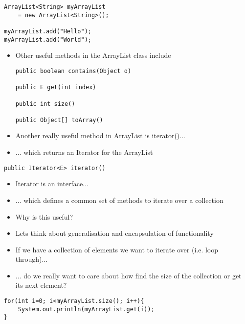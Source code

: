 \documentclass{beamer}
\begin{document}
\begin{frame}[fragile]
\begin{block}{}
\begin{lstlisting}
ArrayList<String> myArrayList 
    = new ArrayList<String>();

myArrayList.add("Hello");
myArrayList.add("World");
\end{lstlisting}
\end{block}
\end{frame} 

\begin{frame}[fragile]
\begin{itemize}
\item Other useful methods in the ArrayList class include
\begin{block}{}
\begin{lstlisting}
public boolean contains(Object o)

public E get(int index)

public int size()

public Object[] toArray()
\end{lstlisting}
\end{block}
\end{itemize}
\end{frame} 

\begin{frame}[fragile]
\begin{itemize}
\item Another really useful method in ArrayList is iterator()...
\item ... which returns an Iterator for the ArrayList
\end{itemize}
\begin{block}{}
\begin{lstlisting}
public Iterator<E> iterator()
\end{lstlisting}
\end{block}
\begin{itemize}
\item Iterator is an interface...
\item ... which defines a common set of methods to iterate over a collection
\end{itemize}
\end{frame} 

\begin{frame}[fragile]
\begin{itemize}
\item Why is this useful?
\item Lets think about generalisation and encapsulation of functionality
\item If we have a collection of elements we want to iterate over (i.e. loop through)...
\item ... do we really want to care about how find the size of the collection or get its next element?
\end{itemize}
\begin{block}{}
\begin{lstlisting}
for(int i=0; i<myArrayList.size(); i++){
    System.out.println(myArrayList.get(i));
}
\end{lstlisting}
\end{block}
\end{frame}
\end{document}
